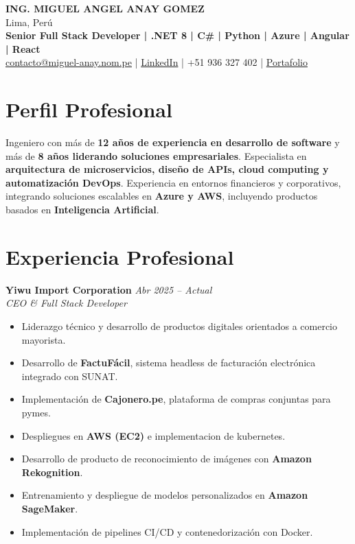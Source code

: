 \documentclass[11pt,a4paper]{article}
\begin{document}
\begin{center}
{\Large \textbf{ING. MIGUEL ANGEL ANAY GOMEZ}}\\
Lima, Perú\\
\textbf{Senior Full Stack Developer | .NET 8 | C\# | Python | Azure | Angular | React}\\
\href{mailto:contacto@miguel-anay.nom.pe}{contacto@miguel-anay.nom.pe} \;|\;
\href{https://www.linkedin.com/in/miguel-anay/}{LinkedIn} \;|\;
+51 936 327 402 \;|\;
\href{https://portfolio.miguel-anay.nom.pe}{Portafolio}
\end{center}

\vspace{0.3cm}

\section*{Perfil Profesional}

Ingeniero con más de \textbf{12 años de experiencia en desarrollo de software} y más de \textbf{8 años liderando soluciones empresariales}.  
Especialista en \textbf{arquitectura de microservicios, diseño de APIs, cloud computing y automatización DevOps}.  
Experiencia en entornos financieros y corporativos, integrando soluciones escalables en \textbf{Azure y AWS}, incluyendo productos basados en \textbf{Inteligencia Artificial}.  

\section*{Experiencia Profesional}

\vspace{6pt}

\textbf{Yiwu Import Corporation} \hfill \textit{Abr 2025 – Actual}\\
\textit{CEO & Full Stack Developer}

\begin{itemize}[leftmargin=*]
  \item Liderazgo técnico y desarrollo de productos digitales orientados a comercio mayorista.
  \item Desarrollo de \textbf{FactuFácil}, sistema headless de facturación electrónica integrado con SUNAT.
  \item Implementación de \textbf{Cajonero.pe}, plataforma de compras conjuntas para pymes.
  \item Despliegues en \textbf{AWS (EC2)} e implementacion de kubernetes.
  \item Desarrollo de producto de reconocimiento de imágenes con \textbf{Amazon Rekognition}.
  \item Entrenamiento y despliegue de modelos personalizados en \textbf{Amazon SageMaker}.
  \item Implementación de pipelines CI/CD y contenedorización con Docker.
\end{itemize}
\end{document}
